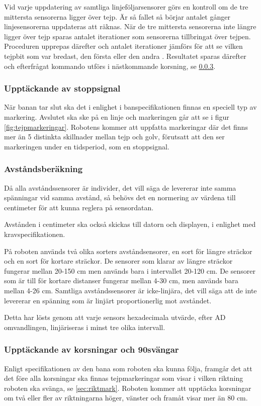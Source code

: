 Vid varje uppdatering av samtliga linjeföljarsensorer görs en kontroll om de 
tre mittersta sensorerna ligger över tejp. Är så fallet så börjar antalet 
gånger linjesensorerna uppdateras att räknas. När de tre mittersta sensorerna 
inte längre ligger över tejp sparas antalet iterationer som sensorerna 
tillbringat över tejpen. Proceduren upprepas därefter och antalet iterationer 
jämförs för att se vilken tejpbit som var bredast, den första eller den andra
. Resultatet sparas därefter och efterfrågat kommando utförs i nästkommande 
korsning, se \ref{sec:upptackkorsning}.

\subsubsection{Upptäckande av stoppsignal}
När banan tar slut ska det i enlighet i banspecifikationen finnas en speciell typ av 
markering. Avslutet ska ske på en linje och markeringen går att se i figur \ref{fig:tejpmarkeringar}.
Robotens kommer att uppfatta markeringar där det finns mer än 5 distinkta skillnader mellan tejp och golv, förutsatt att den ser markeringen under en tidsperiod, som en stoppsignal. 

\subsubsection{Avståndsberäkning}
Då alla avståndssensorer är individer, det vill säga de levererar inte samma spänningar vid
samma avstånd, så behövs det en normering av värdena till centimeter för att kunna reglera
på sensordatan. 

Avstånden i centimeter ska också skickas till datorn och displayen, i enlighet med
kravspecifikationen.

På roboten används två olika sorters avståndsensorer, en sort för längre sträckor och en sort för
kortare sträckor. De sensorer som klarar av längre sträckor fungerar mellan 20-150 cm men 
används bara i intervallet 20-120 cm. De sensorer som är till för kortare distanser fungerar mellan 4-30 cm,
 men används bara mellan 4-26 cm. Samtliga avståndssensorer är icke-linjära, det vill säga att de 
 inte levererar en spänning som är linjärt proportionerlig mot avståndet.

Detta har lösts genom att varje sensors hexadecimala utvärde, efter AD omvandlingen, linjäriseras i minst 
tre olika intervall.

\subsubsection{Upptäckande av korsningar och 90\degree svängar}
\label{sec:upptackkorsning}
Enligt specifikationen av den bana som roboten ska kunna följa, framgår det 
att det före alla korsningar ska finnas tejpmarkeringar som visar i vilken 
riktning roboten ska svänga, se \ref{sec:riktmark}. Roboten kommer att 
upptäcka korsningar om två eller fler av riktningarna höger, vänster och framåt visar 
mer än 80 cm.


